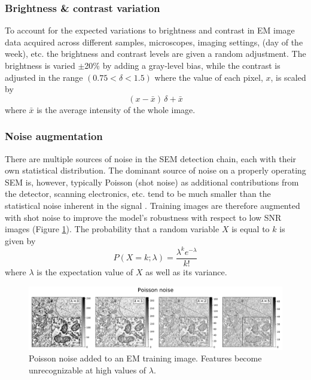 \subsubsection{Brightness \& contrast variation}
To account for the expected variations to brightness and contrast in EM image data acquired across different samples, microscopes, imaging settings, (day of the week), etc. the brightness and contrast levels are given a random adjustment. The brightness is varied ${\pm}$20\% by adding a gray-level bias, while the contrast is adjusted in the range $(0.75 < \delta < 1.5)$ where the value of each pixel, $x$, is scaled by
%
\begin{equation}
    (x - \bar{x})\,\delta + \bar{x}
\end{equation}
%
where $\bar{x}$ is the average intensity of the whole image.

\subsubsection{Noise augmentation}
There are multiple sources of noise in the SEM detection chain, each with their own statistical distribution. The dominant source of noise on a properly operating SEM is, however, typically Poisson (shot noise) as additional contributions from the detector, scanning electronics, etc. tend to be much smaller than the statistical noise inherent in the signal \cite{joy2008noise}. Training images are therefore augmented with shot noise to improve the model’s robustness with respect to low SNR images (Figure \ref{fig:4M_noise}). The probability that a random variable $X$ is equal to $k$ is given by
%
\begin{equation}
    P(X=k;\lambda) = \frac{\lambda^{k} e^{-\lambda}}{k!}
\end{equation}
%
where $\lambda$ is the expectation value of $X$ as well as its variance.

\begin{figure}[!tbh]
    \centering
    \includegraphics[width=\linewidth]{chapter-4/figures_PDF/fig4-M4_noise.pdf}
    \caption{Poisson noise added to an EM training image.
    Features become unrecognizable at high values of $\lambda$.}
    \label{fig:4M_noise}
\end{figure}



